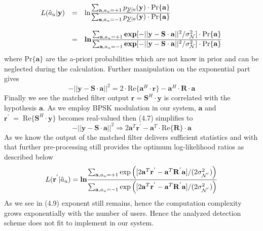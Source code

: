 \begin{eqnarray}
\begin{array}{lll}
L(\hat{a}_u\vert \mathrm{\mathbf{y}})&=&
\mathrm{ln}
\frac
{\hbox{$\sum_{\mathrm{\mathbf{a}},a_u=+1}p_{\underline{\mathcal{Y}}\vert a}(\mathrm{\mathbf{y}})\cdot \mathrm{Pr}\{\mathrm{\mathbf{a}}\}$}}
{\hbox{$\sum_{\mathrm{\mathbf{a}},a_u=-1}p_{\underline{\mathcal{Y}}\vert a}(\mathrm{\mathbf{y}})\cdot \mathrm{Pr}\{\mathrm{\mathbf{a}}\}$}} \\ \\
&=&
\mathrm{\mathbf{ln}}
\frac
{\hbox{$\sum_{\mathrm{\mathbf{a}},a_u=+1}\mathrm{\mathbf{exp}}[-\vert\vert \mathrm{\mathbf{y}}-\mathrm{\mathbf{S}}\cdot \mathrm{\mathbf{a}}\vert \vert ^2 / \sigma^2_{\mathcal{N}}]\cdot \mathrm{Pr}\{\mathrm{\mathbf{a}}\}$}}
{\hbox{$\sum_{\mathrm{\mathbf{a}},a_u=-1}\mathrm{\mathbf{exp}}[-\vert\vert \mathrm{\mathbf{y}}-\mathrm{\mathbf{S}}\cdot \mathrm{\mathbf{a}}\vert \vert ^2 / \sigma^2_{\mathcal{N}}]\cdot \mathrm{Pr}\{\mathrm{\mathbf{a}}\}$}}
\end{array}
\end{eqnarray}
where $\mathrm{Pr}\{\mathrm{\mathbf{a}}\}$ are the a-priori probabilities which are not know in prior and can be neglected during the calculation. Further manipulation on the exponential part gives 
\begin{equation}
-\vert\vert\mathrm{\mathbf{y}}-\mathrm{\mathbf{S}}\cdot\mathrm{\mathbf{a}}\vert\vert ^2 = 2\cdot \mathrm{Re}\{\mathrm{\mathbf{a}}^H\cdot\mathrm{\mathbf{r}}\}-\mathrm{\mathbf{a}}^H \cdot \mathrm{\mathbf{R}}\cdot \mathrm{\mathbf{a}}
\end{equation}
Finally we see the matched filter output $\mathrm{\mathbf{r}}=\mathrm{\mathbf{S}}^H\cdot\mathrm{\mathbf{y}}$ is correlated with the hypothesis $\mathrm{\mathbf{a}}$. As we employ BPSK modulation in our system, $\mathrm{\mathbf{a}}$ and $\mathrm{\mathbf{r}}^{'}\;=\;\mathrm{Re}\{\mathrm{\mathbf{S}}^H\cdot \mathrm{\mathbf{y}}\}$ becomes real-valued then (4.7) simplifies to
\begin{equation}
-\vert\vert\mathrm{\mathbf{y}}-\mathrm{\mathbf{S}}\cdot\mathrm{\mathbf{a}}\vert\vert ^2 \Longrightarrow 2\mathrm{\mathbf{a}}^T\mathrm{\mathbf{r}}^{'}-\mathrm{\mathbf{a}}^T\cdot \mathrm{Re}\{\mathrm{\mathbf{R}}\}\cdot \mathrm{\mathbf{a}}
\end{equation}
As we know the output of the matched filter delivers sufficient statistics and with that further pre-processing still provides the optimum log-likelihood ratios as described below
\begin{equation}
L(\mathrm{\mathbf{r}}^{'}\vert \hat{a}_u)=\mathrm{\mathbf{ln}}\frac{\hbox{$\sum_{\mathrm{\mathbf{a}},a_u=+1}\mathrm{exp}\left([2\mathrm{\mathbf{a}}^T\mathrm{\mathbf{r}}^{'}-\mathrm{\mathbf{a}}^T\mathrm{\mathbf{R}}^{'}\mathrm{\mathbf{a}}]/(2\sigma^2_{\mathcal{N}^{'}})\right)$}}{\hbox{$\sum_{\mathrm{\mathbf{a}},a_u=-1}\mathrm{exp}\left([2\mathrm{\mathbf{a}}^T\mathrm{\mathbf{r}}^{'}-\mathrm{\mathbf{a}}^T\mathrm{\mathbf{R}}^{'}\mathrm{\mathbf{a}}]/(2\sigma^2_{\mathcal{N}^{'}})\right)$}}
\end{equation}
As we see in (4.9) exponent still remains, hence the computation complexity grows exponentially with the number of users. Hence the analyzed detection scheme does not fit to implement in our system. 
